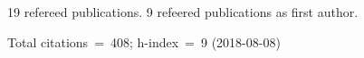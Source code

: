 19 refereed publications. 9 refeered publications as first author.

               Total citations~=~408; h-index~=~9 (2018-08-08)